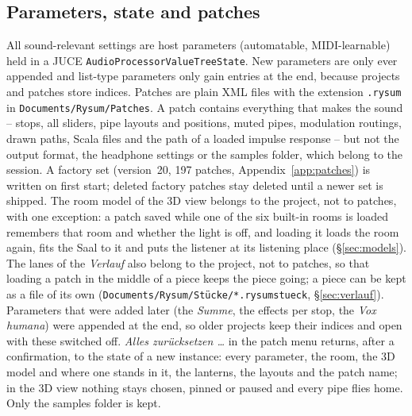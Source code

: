 \documentclass[11pt,a4paper,parskip=half,DIV=11,toc=bibliography]{scrartcl}
\newcommand{\ui}[1]{\emph{#1}}                 %
\newcommand{\code}[1]{\texttt{#1}}
\newcommand{\fn}[1]{\mbox{\texttt{#1}}}
\begin{document}
\subsection{Parameters, state and patches}
All sound-relevant settings are host parameters (automatable, MIDI-learnable) held in a JUCE
\code{AudioProcessorValueTreeState}. New parameters are only ever appended and list-type parameters
only gain entries at the end, because projects and patches store indices. Patches are plain XML files
with the extension \fn{.rysum} in \fn{Documents/Rysum/Patches}. A patch contains everything that makes
the sound -- stops, all sliders, pipe layouts and positions, muted pipes, modulation routings, drawn
paths, Scala files and the path of a loaded impulse response -- but not the output format, the headphone
settings or the samples folder, which belong to the session. A factory set (version~20, 197 patches,
Appendix~\ref{app:patches}) is written on first start; deleted factory patches stay deleted until a
newer set is shipped. The room model of the 3D view belongs to the project, not to patches, with one exception: a patch saved
while one of the six built-in rooms is loaded remembers that room and whether the light is off, and loading it loads the room
again, fits the Saal to it and puts the listener at its listening place (\S\ref{sec:models}). The lanes of the \ui{Verlauf} also belong to the project,
not to patches, so that loading a patch in the middle of a piece keeps the piece going; a piece can be kept as a file of its own
(\fn{Documents/Rysum/Stücke/*.rysumstueck}, \S\ref{sec:verlauf}). Parameters that were added later (the \ui{Summe}, the effects per stop, the
\ui{Vox humana}) were appended at the end, so older projects keep their indices and open with these switched off. \ui{Alles zurücksetzen \dots} in
the patch menu returns, after a confirmation, to the state of a new instance: every parameter, the room, the 3D model and where one stands in it,
the lanterns, the layouts and the patch name; in the 3D view nothing stays chosen, pinned or paused and every pipe flies home. Only the samples
folder is kept.
\end{document}
